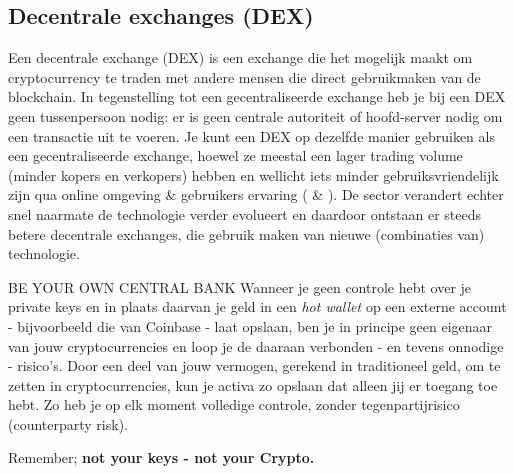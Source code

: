 \subsection*{Decentrale exchanges (DEX)}
\label{subsubsec:DEX}

Een decentrale exchange (DEX) is een exchange die het mogelijk maakt om cryptocurrency te traden met andere mensen die direct gebruikmaken van de blockchain. In tegenstelling tot een gecentraliseerde exchange heb je bij een DEX geen tussenpersoon nodig: er is geen centrale autoriteit of hoofd-server nodig om een transactie uit te voeren. Je kunt een DEX op dezelfde manier gebruiken als een gecentraliseerde exchange, hoewel ze meestal een lager trading volume (minder kopers en verkopers) hebben en wellicht iets minder gebruiksvriendelijk zijn qua online omgeving \& gebruikers ervaring ( \& ). De sector verandert echter snel naarmate de technologie verder evolueert en daardoor ontstaan er steeds betere decentrale exchanges, die gebruik maken van nieuwe (combinaties van) technologie.

\medskip

\begin{cryptobox}{BE YOUR OWN CENTRAL BANK}
    Wanneer je geen controle hebt over je private keys en in plaats daarvan je geld in een \emph{hot wallet} op een externe account - bijvoorbeeld die van Coinbase - laat opslaan, ben je in principe geen eigenaar van jouw cryptocurrencies en loop je de daaraan verbonden - en tevens onnodige - risico's. Door een deel van jouw vermogen, gerekend in traditioneel geld, om te zetten in cryptocurrencies, kun je activa zo opslaan dat alleen jij er toegang toe hebt. Zo heb je op elk moment volledige controle, zonder tegenpartijrisico (counterparty risk).
    
    \tcblower
    Remember; \textbf{not your keys - not your Crypto.}
\end{cryptobox}

\medskip

